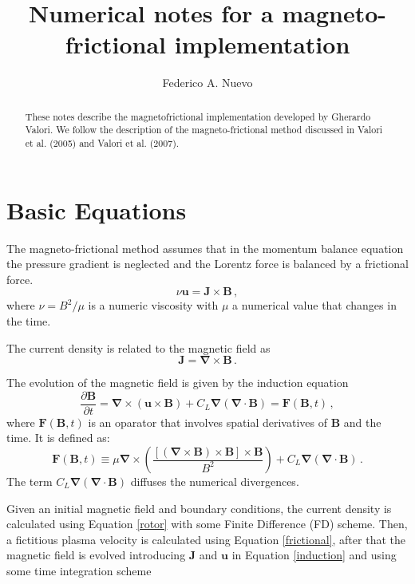 \documentclass[a4paper,10pt]{article}
\title{Numerical notes for a magneto-frictional implementation		}
\author{Federico A. Nuevo				
}
\def\bB{{\boldsymbol{B}}}
\def\bJ{{\boldsymbol{J}}}
\def\bu{{\boldsymbol{u}}}
\def\rot{\boldsymbol{\nabla \times}}
\def\grad{\boldsymbol{\nabla}}
\def\div{\boldsymbol{\nabla \cdot}}
\def\dt#1{\frac{\partial #1}{\partial t}}
\def\bF#1{\boldsymbol{F}(#1)}
\begin{document}
\maketitle

\begin{abstract}
These notes describe the magnetofrictional implementation developed by Gherardo Valori. We follow the description of the magneto-frictional method discussed in Valori et al. (2005) and Valori et al. (2007).
\end{abstract}

\section{Basic Equations}
The magneto-frictional method assumes that in the momentum balance equation the pressure gradient is neglected and the Lorentz force is balanced by a frictional force. 
\begin{equation}
 \nu {\bu}= {\bJ} \times {\bB} \,,
\label{frictional}
\end{equation}
where $\nu = B^2/\mu$ is a numeric viscosity with $\mu$  a numerical value that changes in the time. 

The current density is related to the magnetic field as  
\begin{equation}
 \bJ = \rot \bB  \,.
\label{rotor}
\end{equation}

The evolution of the magnetic field is given by the induction equation
\begin{equation}
\dt{\bB} = \rot (\bu \times \bB) + C_L \grad (\div \bB) = \bF{\bB,t}
\,,
\label{induction}
\end{equation}
where $\bF{\bB,t}$ is an oparator that involves spatial derivatives of $\bB$ and the time. It is defined as:
\begin{equation}
 \bF{\bB,t}\equiv \mu \rot \left(\frac{[({ \rot \bB}) \times {\bB}] \times \bB}{B^2}\right) + C_L \grad (\div \bB) \,.
 \label{opF}
\end{equation}
The term $ C_L \grad (\div \bB)$ diffuses the numerical divergences.

Given an initial magnetic field and boundary conditions, the current density is calculated using Equation \ref{rotor} with some Finite Difference (FD) scheme. Then, a fictitious plasma velocity is calculated using Equation \ref{frictional}, after that the magnetic field is evolved introducing $\bJ$ and $\bu$ in Equation \ref{induction} and using some time integration scheme
\end{document}
